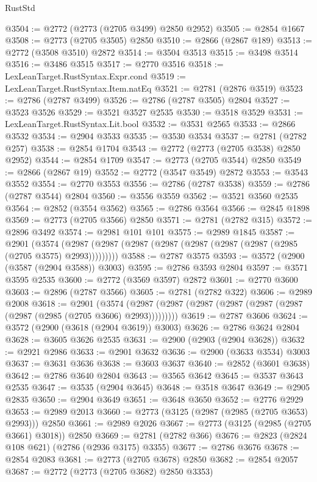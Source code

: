 \begin{lexlean}{RustStd}
\begin{coremodule}
@3504 := @2772 (@2773 (@2705 @3499) @2850 @2952)
@3505 := @2854 @1667
@3508 := @2773 (@2705 @3505) @2850
@3510 := @2866 (@2867 @189)
@3513 := @2772 (@3508 @3510) @2872
@3514 := @3504 @3513
@3515 := @3498 @3514
@3516 := @3486 @3515
@3517 := @2770 @3516
@3518 := LexLeanTarget.RustSyntax.Expr.cond
@3519 := LexLeanTarget.RustSyntax.Item.natEq
@3521 := @2781 (@2876 @3519)
@3523 := @2786 (@2787 @3499)
@3526 := @2786 (@2787 @3505) @2804
@3527 := @3523 @3526
@3529 := @3521 @3527 @2535
@3530 := @3518 @3529
@3531 := LexLeanTarget.RustSyntax.Lit.bool
@3532 := @3531 @2565
@3533 := @2866 @3532
@3534 := @2904 @3533
@3535 := @3530 @3534
@3537 := @2781 (@2782 @257)
@3538 := @2854 @1704
@3543 := @2772 (@2773 (@2705 @3538) @2850 @2952)
@3544 := @2854 @1709
@3547 := @2773 (@2705 @3544) @2850
@3549 := @2866 (@2867 @19)
@3552 := @2772 (@3547 @3549) @2872
@3553 := @3543 @3552
@3554 := @2770 @3553
@3556 := @2786 (@2787 @3538)
@3559 := @2786 (@2787 @3544) @2804
@3560 := @3556 @3559
@3562 := @3521 @3560 @2535
@3564 := @2852 (@3554 @3562)
@3565 := @2786 @3564
@3566 := @2845 @1898
@3569 := @2773 (@2705 @3566) @2850
@3571 := @2781 (@2782 @315)
@3572 := @2896 @3492
@3574 := @2981 @101 @101
@3575 := @2989 @1845
@3587 := @2901
    (@3574 (@2987 (@2987 (@2987 (@2987 (@2987 (@2987 (@2987 (@2985 (@2705 @3575) @2993)))))))))
@3588 := @2787 @3575
@3593 := @3572 (@2900 (@3587 (@2904 @3588)) @3003)
@3595 := @2786 @3593 @2804
@3597 := @3571 @3595 @2535
@3600 := @2772 (@3569 @3597) @2872
@3601 := @2770 @3600
@3603 := @2896 (@2787 @3566)
@3605 := @2781 (@2782 @322)
@3606 := @2989 @2008
@3618 := @2901
    (@3574 (@2987 (@2987 (@2987 (@2987 (@2987 (@2987 (@2987 (@2985 (@2705 @3606) @2993)))))))))
@3619 := @2787 @3606
@3624 := @3572 (@2900 (@3618 (@2904 @3619)) @3003)
@3626 := @2786 @3624 @2804
@3628 := @3605 @3626 @2535
@3631 := @2900 (@2903 (@2904 @3628))
@3632 := @2921 @2986
@3633 := @2901 @3632
@3636 := @2900 (@3633 @3534) @3003
@3637 := @3631 @3636
@3638 := @3603 @3637
@3640 := @2852 (@3601 @3638)
@3642 := @2786 @3640 @2804
@3643 := @3565 @3642
@3645 := @3537 @3643 @2535
@3647 := @3535 (@2904 @3645)
@3648 := @3518 @3647
@3649 := @2905 @2835
@3650 := @2904 @3649
@3651 := @3648 @3650
@3652 := @2776 @2929
@3653 := @2989 @2013
@3660 := @2773 (@3125 (@2987 (@2985 (@2705 @3653) @2993))) @2850
@3661 := @2989 @2026
@3667 := @2773 (@3125 (@2985 (@2705 @3661) @3018)) @2850
@3669 := @2781 (@2782 @366)
@3676 := @2823 (@2824 @108 @621) (@2786 (@2936 @3175) @3355)
@3677 := @2786 @3676
@3678 := @2854 @2083
@3681 := @2773 (@2705 @3678) @2850
@3682 := @2854 @2057
@3687 := @2772 (@2773 (@2705 @3682) @2850 @3353)

\end{coremodule}
\end{lexlean}
